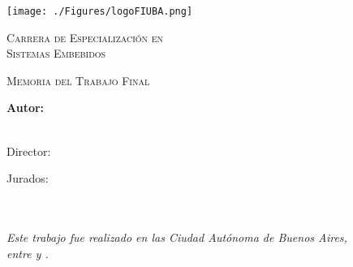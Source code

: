 \documentclass[
11pt, %
spanish,
singlespacing, %
parskip, %
headsepline, %
]{MastersDoctoralThesis} %
\author{Ing. Alexis Martin Pojomovsky} %
\begin{document}
\frontmatter %

\pagestyle{plain} %


\begin{titlepage}
\begin{center}


\texttt{[image: ./Figures/logoFIUBA.png]}
\vspace{2cm}

\textsc{\huge{Carrera de Especialización en\\ \vspace{5px} Sistemas Embebidos}}
\vspace{.5cm} %

\textsc{\Large Memoria del Trabajo Final}\\[1cm] %
{\huge \bfseries \ttitle\par}\vspace{0.4cm} %

\vfill

\vspace{1.5cm}
\LARGE\textbf{Autor:\\
\authorname}\\ %

\vspace{1.5cm}

\large
{Director:} \\
{\supname} %
 
\vspace{1cm}
Jurados:\\	
\jurunoname\\
\jurdosname\\
\jurtresname

\vspace{2cm}

\textit{Este trabajo fue realizado en las Ciudad Autónoma de Buenos Aires,\\ entre \fechaINICIOname \hspace{1px} y \fechaFINALname.}
\end{center}
\end{titlepage}
\end{document}
